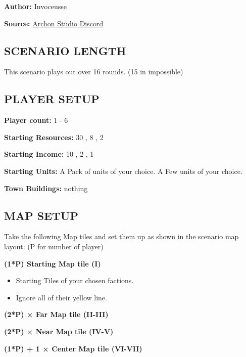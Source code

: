 
\begin{multicols*}{2}

\textbf{Author:} Invoceusse

\textbf{Source:} \href{https://discord.com/channels/740870068178649108/1219333721019256943}{Archon Studio Discord}

\subsection*{\MakeUppercase{Scenario length}}

This scenario plays out over 16 rounds. (15 in impossible)

\subsection*{\MakeUppercase{Player setup}}

\textbf{Player count:} 1 - 6

\textbf{Starting Resources:} 30 , 8 , 2 

\textbf{Starting Income:} 10 , 2 , 1 

\textbf{Starting Units:} 
    A Pack of  units of your choice.
    A Few  units of your choice.

\textbf{Town Buildings:} nothing

\subsection*{\MakeUppercase{Map setup}}

Take the following Map tiles and set them up as shown in the scenario map layout: (P for number of player)

\textbf{(1*P) Starting Map tile (I)}
\begin{itemize}
    \item Starting Tiles of your chosen factions.
    \item Ignore all of their yellow line.
\end{itemize}

\textbf{(2*P) × Far Map tile (II-III)}

\textbf{(2*P) × Near Map tile (IV-V)}

\textbf{(1*P) + 1 × Center Map tile (VI-VII)}


\end{multicols*}
